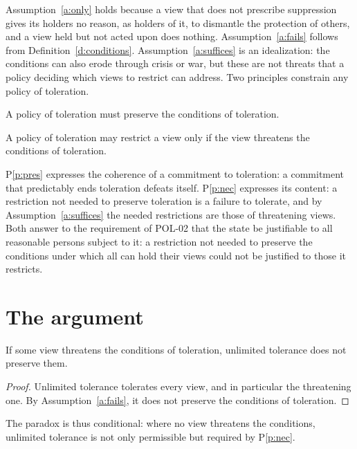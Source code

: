 \documentclass{situationist-preprint}
\begin{document}
Assumption~\ref{a:only} holds because a view that does not prescribe suppression gives its holders no reason, as holders of it, to dismantle the protection of others, and a view held but not acted upon does nothing. Assumption~\ref{a:fails} follows from Definition~\ref{d:conditions}. Assumption~\ref{a:suffices} is an idealization: the conditions can also erode through crisis or war, but these are not threats that a policy deciding which views to restrict can address. Two principles constrain any policy of toleration.

\begin{principle}[Preservation]\label{p:pres}
A policy of toleration must preserve the conditions of toleration.
\end{principle}

\begin{principle}[Necessity]\label{p:nec}
A policy of toleration may restrict a view only if the view threatens the conditions of toleration.
\end{principle}

P\ref{p:pres} expresses the coherence of a commitment to toleration: a commitment that predictably ends toleration defeats itself. P\ref{p:nec} expresses its content: a restriction not needed to preserve toleration is a failure to tolerate, and by Assumption~\ref{a:suffices} the needed restrictions are those of threatening views. Both answer to the requirement of POL-02 that the state be justifiable to all reasonable persons subject to it: a restriction not needed to preserve the conditions under which all can hold their views could not be justified to those it restricts.

\section{The argument}

\begin{theorem}\label{t:paradox}
If some view threatens the conditions of toleration, unlimited tolerance does not preserve them.
\end{theorem}

\begin{proof}
Unlimited tolerance tolerates every view, and in particular the threatening one. By Assumption~\ref{a:fails}, it does not preserve the conditions of toleration.
\end{proof}

The paradox is thus conditional: where no view threatens the conditions, unlimited tolerance is not only permissible but required by P\ref{p:nec}.
\end{document}
